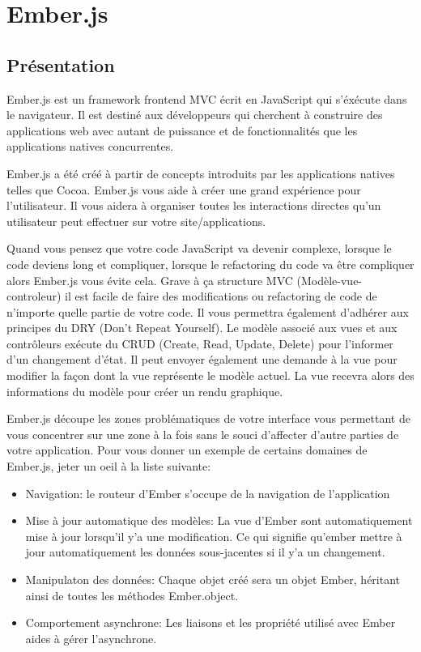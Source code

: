 \section{Ember.js}
\label{ch:ember}

\subsection*{Présentation}


Ember.js est un framework frontend MVC écrit en JavaScript qui s’éxécute dans le navigateur. Il est destiné aux développeurs qui cherchent à construire des applications web avec autant de puissance et de fonctionnalités que les applications natives concurrentes.

Ember.js a été créé à partir de concepts introduits par les applications natives telles que Cocoa. Ember.js vous aide à créer une grand expérience pour l’utilisateur. Il vous aidera à organiser toutes les interactions directes qu’un utilisateur peut effectuer sur votre site/applications.

Quand vous pensez que votre code JavaScript va devenir complexe, lorsque le code deviens long et compliquer, lorsque le refactoring du code va être compliquer alors Ember.js vous évite cela. Grave à ça structure MVC (Modèle-vue-controleur) il est facile de faire des modifications ou refactoring de code de n’importe quelle partie de votre code. Il vous permettra également d’adhérer aux principes du DRY (Don’t Repeat Yourself). Le modèle associé aux vues et aux contrôleurs exécute du CRUD (Create, Read, Update, Delete) pour l’informer d’un changement d’état. Il peut envoyer également une demande à la vue pour modifier la façon dont la vue représente le modèle actuel. La vue recevra alors des informations du modèle pour créer un rendu graphique. 

Ember.js découpe les zones problématiques de votre interface vous permettant de vous concentrer sur une zone à la fois sans le souci d’affecter d’autre parties de votre application. Pour vous donner un exemple de certains domaines de Ember.js, jeter un oeil à la liste suivante:

\begin{itemize}

  \item[\textbullet]
  Navigation: le routeur d’Ember s’occupe de la navigation de l'application

  \item[\textbullet]
  Mise à jour automatique des modèles: La vue d’Ember sont automatiquement mise à jour lorsqu’il y’a une modification. Ce qui signifie qu’ember mettre à jour automatiquement les données sous-jacentes si il y’a un changement.

  \item[\textbullet]
  Manipulaton des données: Chaque objet créé sera un objet Ember, héritant ainsi de toutes les méthodes Ember.object.

  \item[\textbullet]
  Comportement asynchrone: Les liaisons et les propriété utilisé avec Ember aides à gérer l’asynchrone.

\end{itemize}

